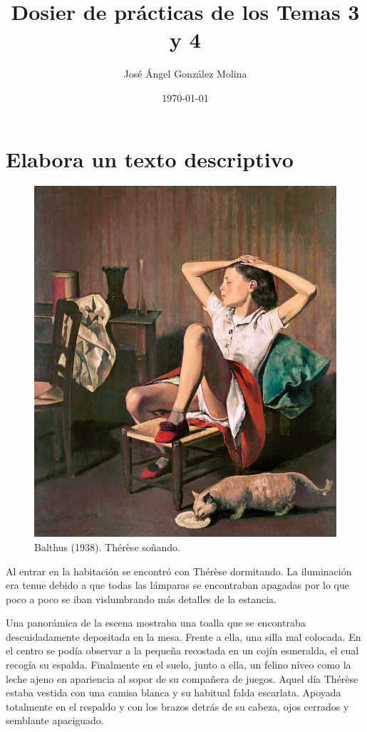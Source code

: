 \documentclass[12pt, a4paper, oneside]{report}
\title{Dosier de prácticas de los Temas 3 y 4}
\author{José Ángel González Molina}
\date{\today}
\begin{document}
    \color{negro}
    \maketitle
    \clearpage

    \renewcommand{\chaptername}{Ejercicio}
    \renewcommand{\figurename}{Fig.}
    \chapter{Elabora un texto descriptivo}
        \begin{figure}[ht]
            \centering
            \includegraphics[scale = .75]{balthus}
            \caption{Balthus (1938). Thérèse soñando.}
        \end{figure}
        Al entrar en la habitación se encontró con Thérèse dormitando. La iluminación era tenue debido a que
        todas las lámparas se encontraban apagadas por lo que poco a poco se iban vislumbrando más detalles de
        la estancia.

        Una panorámica de la escena mostraba una toalla que se encontraba descuidadamente depositada en la
        mesa. Frente a ella, una silla mal colocada. En el centro se podía observar a la pequeña recostada en
        un cojín esmeralda, el cual recogía su espalda. Finalmente en el suelo, junto a ella, un felino níveo
        como la leche ajeno en apariencia al sopor de su compañera de juegos. Aquel día Thérèse estaba vestida
        con una camisa blanca y su habitual falda escarlata. Apoyada totalmente en el respaldo y con los
        brazos detrás de su cabeza, ojos cerrados y semblante apaciguado.
\end{document}
